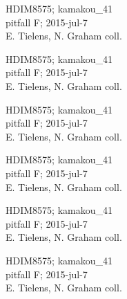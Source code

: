 \documentclass[2pt]{extarticle}
\begin{document}
\noindent
\parbox{0.16\textwidth}{\tiny \raggedright \rule[-0.3\baselineskip]{0pt}{10pt}HDIM8575; kamakou\_41\\ pitfall F; 2015-jul-7\\ E. Tielens, N. Graham coll.}
\parbox{0.16\textwidth}{\tiny \raggedright \rule[-0.3\baselineskip]{0pt}{10pt}HDIM8575; kamakou\_41\\ pitfall F; 2015-jul-7\\ E. Tielens, N. Graham coll.}
\parbox{0.16\textwidth}{\tiny \raggedright \rule[-0.3\baselineskip]{0pt}{10pt}HDIM8575; kamakou\_41\\ pitfall F; 2015-jul-7\\ E. Tielens, N. Graham coll.}
\parbox{0.16\textwidth}{\tiny \raggedright \rule[-0.3\baselineskip]{0pt}{10pt}HDIM8575; kamakou\_41\\ pitfall F; 2015-jul-7\\ E. Tielens, N. Graham coll.}
\parbox{0.16\textwidth}{\tiny \raggedright \rule[-0.3\baselineskip]{0pt}{10pt}HDIM8575; kamakou\_41\\ pitfall F; 2015-jul-7\\ E. Tielens, N. Graham coll.}
\parbox{0.16\textwidth}{\tiny \raggedright \rule[-0.3\baselineskip]{0pt}{10pt}HDIM8575; kamakou\_41\\ pitfall F; 2015-jul-7\\ E. Tielens, N. Graham coll.}
\end{document}
